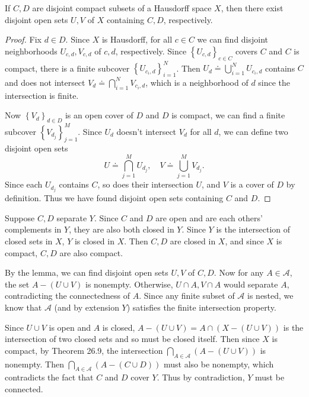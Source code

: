 \documentclass[10pt]{report}
\begin{document}
\begin{lem}
	If $C, D$ are disjoint compact subsets of a Hausdorff space $X$, then there exist disjoint open sets $U,V$ of $X$ containing $C,D$, respectively.
\end{lem}
\begin{proof}
	Fix $d \in D$. Since $X$ is Hausdorff, for all $c \in C$ we can find disjoint neighborhoods $U_{c,d}, V_{c,d}$ of $c,d$, respectively. Since $\left\{ U_{c,d} \right\}_{c \in C}$ covers $C$ and $C$ is compact, there is a finite subcover $\left\{ U_{c_i,d} \right\}_{i=1}^N$. Then $U_{d}\doteq \bigcup_{i=1}^N U_{c_i,d}$ contains $C$ and does not intersect $V_{d}\doteq \bigcap_{i=1}^N V_{c_i,d}$, which is a neighborhood of $d$ since the intersection is finite.

	Now $\left\{ V_{d} \right\}_{d \in D}$ is an open cover of $D$ and $D$ is compact, we can find a finite subcover $\left\{ V_{d_j} \right\}_{j=1}^M$. Since $U_d$ doesn't intersect $V_d$ for all $d$, we can define two disjoint open sets
	\[
		U \doteq \bigcap_{j=1}^M U_{d_j}, \quad V \doteq \bigcup_{j=1}^M V_{d_j}.
	\] 
	Since each $U_{d_j}$ contains $C$, so does their intersection $U$, and $V$ is a cover of $D$ by definition. Thus we have found disjoint open sets containing $C$ and $D$.
\end{proof}

Suppose $C,D$ separate $Y$. Since $C$ and $D$ are open and are each others' complements in $Y$, they are also both closed in $Y$. Since $Y$ is the intersection of closed sets in $X$, $Y$ is closed in $X$. Then $ C,D$ are closed in $X$, and since $X$ is compact, $C,D$ are also compact.

By the lemma, we can find disjoint open sets $U,V$ of $C,D$. Now for any $A \in \mathcal{A}$, the set $A - (U \cup V)$ is nonempty. Otherwise, $U \cap A, V \cap A$ would separate $A$, contradicting the connectedness of $A$. Since any finite subset of $\mathcal{A}$ is nested, we know that $\mathcal{A}$ (and by extension $Y$) satisfies the finite intersection property.

Since $U \cup V$ is open and $A$ is closed, $A - (U \cup V) = A \cap (X-(U \cup V))$ is the intersection of two closed sets and so must be closed itself. Then since $X$ is compact, by Theorem 26.9, the intersection $\bigcap_{A \in \mathcal{A}}(A - (U \cup V))$ is nonempty. Then $\bigcap_{A \in \mathcal{A}}(A - (C \cup D))$ must also be nonempty, which contradicts the fact that $C$ and $D$ cover $Y$. Thus by contradiction, $Y$ must be connected.
\end{document}
